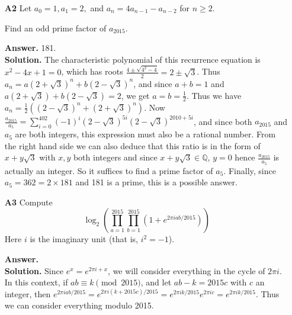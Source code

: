 \documentclass[11pt,a4paper]{article}
\begin{document}
\begin{enumerate}
	\item[\textbf{A2}]Let $a_0=1,a_1=2,$ and $a_n=4a_{n-1}-a_{n-2}$ for $n\ge 2.$
	
	Find an odd prime factor of $a_{2015}.$
	
	\textbf{Answer.} 181. \\
	\textbf{Solution.} The characteristic polynomial of this recurrence equation is $x^2-4x+1=0$, which has roots $\frac{4\pm\sqrt{4^2-4}}{2}=2\pm\sqrt{3}$. Thus $a_n=a(2+\sqrt{3})^n+b(2-\sqrt{3})^n$, and since $a+b=1$ and $a(2+\sqrt{3})+b(2-\sqrt{3})=2$, we get $a=b=\frac 12$. Thus we have $a_n=\frac 12 ((2-\sqrt{3})^n + (2+\sqrt{3})^n)$. 
	Now $\frac{a_{2015}}{a_5}=\sum_{i=0}^{402}(-1)^{i}(2-\sqrt{3})^{5i}(2-\sqrt{3})^{2010+5i}$, and since both $a_{2015}$ and $a_5$ are both integers, this expression must also be a rational number. From the right hand side we can also deduce that this ratio is in the form of $x+y\sqrt{3}$ with $x, y$ both integers and since $x+y\sqrt{3}\in \mathbb{Q}$, $y=0$ hence $\frac{a_{2015}}{a_5}$ is actually an integer. So it suffices to find a prime factor of $a_5$. Finally, since $a_5=362=2\times 181$ and 181 is a prime, this is a possible answer. 
	
	\item[\textbf{A3}]Compute \[\log_2\left(\prod_{a=1}^{2015}\prod_{b=1}^{2015}\left(1+e^{2\pi iab/2015}\right)\right)\]Here $i$ is the imaginary unit (that is, $i^2=-1$).
	
	\textbf{Answer.} \\
	\textbf{Solution.} Since $e^x = e^{2\pi i + x}$, we will consider everything in the cycle of $2\pi i$. In this context, if $ab\equiv k\pmod{2015}$, and let $ab-k=2015c$ with $c$ an integer, then $e^{2\pi iab/2015}=e^{2\pi i(k+2015c)/2015}=e^{2\pi ik/2015}e^{2\pi ic}=e^{2\pi ik/2015}$. Thus we can consider everything modulo 2015. 
	

\end{enumerate}
\end{document}
